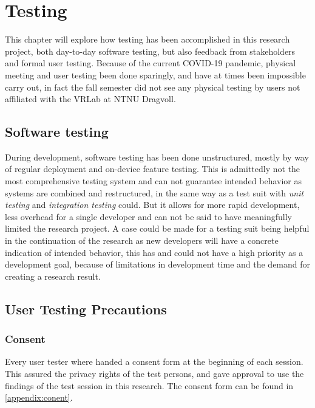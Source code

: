 \chapter{Testing}


This chapter will explore how testing has been accomplished in this research project, both day-to-day software testing, but also feedback from stakeholders and formal user testing. Because of the current COVID-19 pandemic, physical meeting and user testing been done sparingly, and have at times been impossible carry out, in fact the fall semester did not see any physical testing by users not affiliated with the VRLab at NTNU Dragvoll.

\section{Software testing}
During development, software testing has been done unstructured, mostly by way of regular deployment and on-device feature testing. This is admittedly not the most comprehensive testing system and can not guarantee intended behavior as systems are combined and restructured, in the same way as a test suit with \textit{unit testing} and \textit{integration testing} could. But it allows for more rapid development, less overhead for a single developer and can not be said to have meaningfully limited the research project. A case could be made for a testing suit being helpful in the continuation of the research as new developers will have a concrete indication of intended behavior, this has and could not have a high priority as a development goal, because of limitations in development time and the demand for creating a research result.

\section{User Testing Precautions}

\subsection*{Consent}
Every user tester where handed a consent form at the beginning of each session. This assured the privacy rights of the test persons, and gave approval to use the findings of the test session in this research. The consent form can be found in \autoref{appendix:conent}.

